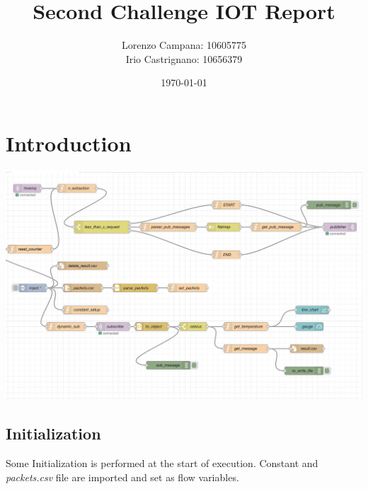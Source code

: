\documentclass[12pt,a4paper]{article}
\begin{document}
\title{\textbf{Second Challenge IOT Report}}
\author{Lorenzo Campana: 10605775 \\ Irio Castrignano: 10656379}
\date{\today}
\maketitle

\section{Introduction}

\includegraphics[scale = 0.5]{images/result.png}

\subsection*{Initialization}
Some Initialization is performed at the start of execution. Constant and \textit{packets.csv} file are imported and set as flow variables.
\end{document}
